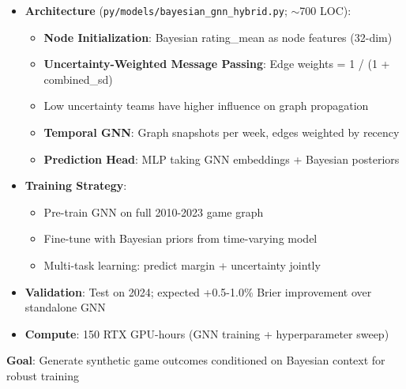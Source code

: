 \begin{itemize}
  \item {} \textbf{Architecture} (\texttt{py/models/bayesian\_gnn\_hybrid.py}; $\sim$700 LOC):
  \begin{itemize}
    \item \textbf{Node Initialization}: Bayesian rating\_mean as node features (32-dim)
    \item \textbf{Uncertainty-Weighted Message Passing}: Edge weights = 1 / (1 + combined\_sd)
    \item Low uncertainty teams have higher influence on graph propagation
    \item \textbf{Temporal GNN}: Graph snapshots per week, edges weighted by recency
    \item \textbf{Prediction Head}: MLP taking GNN embeddings + Bayesian posteriors
  \end{itemize}
  \item {} \textbf{Training Strategy}:
  \begin{itemize}
    \item Pre-train GNN on full 2010-2023 game graph
    \item Fine-tune with Bayesian priors from time-varying model
    \item Multi-task learning: predict margin + uncertainty jointly
  \end{itemize}
  \item {} \textbf{Validation}: Test on 2024; expected +0.5-1.0\% Brier improvement over standalone GNN
  \item \textbf{Compute}: 150 RTX GPU-hours (GNN training + hyperparameter sweep)
\end{itemize}

\textbf{Goal}: Generate synthetic game outcomes conditioned on Bayesian context for robust training

